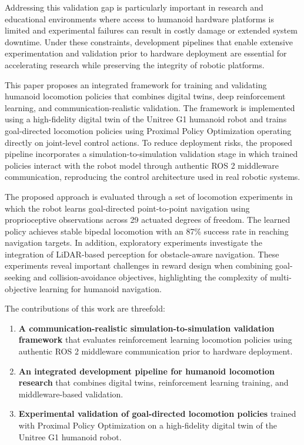 \documentclass[pdflatex,sn-mathphys-num]{sn-jnl}%
\theoremstyle{thmstyleone}%
\theoremstyle{thmstyletwo}%
\theoremstyle{thmstylethree}%
\begin{document}
Addressing this validation gap is particularly important in research and educational environments where access to humanoid hardware platforms is limited and experimental failures can result in costly damage or extended system downtime. Under these constraints, development pipelines that enable extensive experimentation and validation prior to hardware deployment are essential for accelerating research while preserving the integrity of robotic platforms.

This paper proposes an integrated framework for training and validating humanoid locomotion policies that combines digital twins, deep reinforcement learning, and communication-realistic validation. The framework is implemented using a high-fidelity digital twin of the Unitree G1 humanoid robot and trains goal-directed locomotion policies using Proximal Policy Optimization operating directly on joint-level control actions. To reduce deployment risks, the proposed pipeline incorporates a simulation-to-simulation validation stage in which trained policies interact with the robot model through authentic ROS 2 middleware communication, reproducing the control architecture used in real robotic systems.

The proposed approach is evaluated through a set of locomotion experiments in which the robot learns goal-directed point-to-point navigation using proprioceptive observations across 29 actuated degrees of freedom. The learned policy achieves stable bipedal locomotion with an 87\% success rate in reaching navigation targets. In addition, exploratory experiments investigate the integration of LiDAR-based perception for obstacle-aware navigation. These experiments reveal important challenges in reward design when combining goal-seeking and collision-avoidance objectives, highlighting the complexity of multi-objective learning for humanoid navigation.

The contributions of this work are threefold:
\begin{enumerate}
    \item \textbf{A communication-realistic simulation-to-simulation validation framework} that evaluates reinforcement learning locomotion policies using authentic ROS 2 middleware communication prior to hardware deployment.
    \item \textbf{An integrated development pipeline for humanoid locomotion research} that combines digital twins, reinforcement learning training, and middleware-based validation.
    \item \textbf{Experimental validation of goal-directed locomotion policies} trained with Proximal Policy Optimization on a high-fidelity digital twin of the Unitree G1 humanoid robot.
\end{enumerate}
\end{document}

